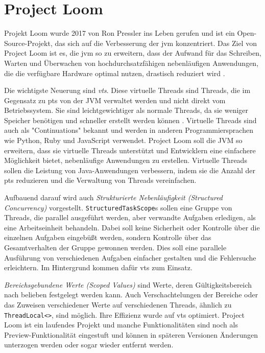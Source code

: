 \chapter{Project Loom}
\label{cha:ProjectLoom}

    Projekt Loom wurde 2017 von Ron Pressler ins Leben gerufen und ist ein Open-Source-Projekt, 
    das sich auf die Verbesserung der \gls{jvm} konzentriert. Das Ziel von Project Loom ist es, 
    die \gls{jvm} so zu erweitern, dass der Aufwand für das Schreiben, Warten und Überwachen von hochdurchsatzfähigen nebenläufigen Anwendungen,
    die die verfügbare Hardware optimal nutzen, drastisch reduziert wird \cite{ProjectLoom}.

    Die wichtigste Neuerung sind \emph{\Glspl{vt}}.
    Diese virtuelle Threads sind Threads, die im Gegensatz zu \Glspl{pt} von der JVM verwaltet werden und nicht direkt vom Betriebssystem. 
    Sie sind leichtgewichtiger als normale Threads, da sie weniger Speicher benötigen und schneller erstellt werden können \cite{JEP444}.
    Virtuelle Threads sind auch als "Continuations" bekannt und werden in anderen Programmiersprachen wie Python, Ruby und JavaScript verwendet.
    Project Loom soll die JVM so erweitern, dass sie virtuelle Threads unterstützt und Entwicklern eine einfachere Möglichkeit bietet,
    nebenläufige Anwendungen zu erstellen. Virtuelle Threads sollen die Leistung von Java-Anwendungen verbessern, indem sie die Anzahl der \Glspl{pt} reduzieren und 
    die Verwaltung von Threads vereinfachen. 

    Aufbauend darauf wird auch \emph{Strukturierte Nebenläufigkeit (Structured Concurrency)} vorgestellt.
    \texttt{StructuredTaskScope}s sollen eine Gruppe von Threads, die parallel ausgeführt werden, aber verwandte Aufgaben erledigen, als eine Arbeitseinheit behandeln. 
    Dabei soll keine Sicherheit oder Kontrolle über die einzelnen Aufgaben eingebüßt werden, sondern Kontrolle über das Gesamtverhalten der Gruppe gewonnen werden.
    Dies soll eine parallele Ausführung von verschiedenen Aufgaben einfacher gestalten und die Fehlersuche erleichtern.
    Im Hintergrund kommen dafür \Glspl{vt} zum Einsatz. \cite{JEP453}

    \emph{Bereichsgebundene Werte (Scoped Values)} sind Werte, deren Gültigkeitsbereich nach belieben festgelegt werden kann.
    Auch Verschachtelungen der Bereiche oder das
    Zuweisen verschiedener Werte auf verschiedenen Threads, ähnlich zu \texttt{ThreadLocal<>}, sind möglich. Ihre Effizienz wurde auf \Glspl{vt} optimiert.
    \cite{JEP481}
    Project Loom ist ein laufendes Projekt und manche Funktionalitäten sind noch als Preview-Funktionalität eingestuft und können in späteren Versionen Änderungen 
    unterzogen werden oder sogar wieder entfernt werden.



